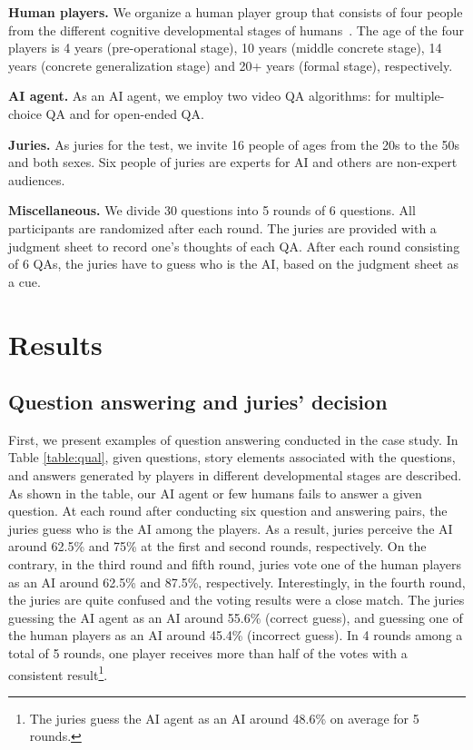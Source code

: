 \documentclass[letterpaper]{article} %
\begin{document}
\noindent \textbf{Human players.  } 
We organize a human player group that consists of four people from the different cognitive developmental stages of humans~\cite{hierarchicalQnA2019heo}. The age of the four players is 4 years (pre-operational stage), 10 years (middle concrete stage), 14 years (concrete generalization stage) and 20+ years (formal stage), respectively.

\noindent \textbf{AI agent.  } 
As an AI agent, we employ two video QA algorithms: \cite{choi2021dramaqa} for multiple-choice QA and \cite{lee2021mounting} for open-ended QA. 

\noindent \textbf{Juries.  } 
As juries for the test, we invite 16 people of ages from the 20s to the 50s and both sexes. Six people of juries are experts for AI and others are non-expert audiences.

\noindent \textbf{Miscellaneous.  } 
We divide 30 questions into 5 rounds of 6 questions. All participants are randomized after each round.
The juries are provided with a judgment sheet to record one's thoughts of each QA. After each round consisting of 6 QAs, the juries have to guess who is the AI, based on the judgment sheet as a cue.

\section{Results}

\subsection{Question answering and juries' decision} 
First, we present examples of question answering conducted in the case study. In Table \ref{table:qual}, given questions, story elements associated with the questions, and answers generated by players in different developmental stages are described. As shown in the table, our AI agent or few humans fails to answer a given question. At each round after conducting six question and answering pairs, the juries guess who is the AI among the players. As a result, juries perceive the AI around 62.5\% and 75\% at the first and second rounds, respectively. On the contrary, in the third round and fifth round, juries vote one of the human players as an AI around 62.5\% and 87.5\%, respectively. Interestingly, in the fourth round, the juries are quite confused and the voting results were a close match. The juries guessing the AI agent as an AI around 55.6\% (correct guess), and guessing one of the human players as an AI around 45.4\% (incorrect guess). In 4 rounds among a total of 5 rounds, one player receives more than half of the votes with a consistent result\footnote{The juries guess the AI agent as an AI around 48.6\% on average for 5 rounds.}.
\end{document}
